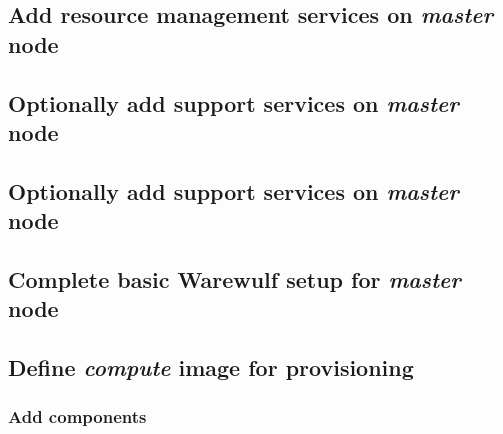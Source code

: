 \documentclass[letterpaper]{article}
\begin{document}
\clearpage
\subsection{Add resource management services on {\em master} node} \label{sec:add_rm}


\subsection{Optionally add \InfiniBand{} support services on {\em master} node} \label{sec:add_ofed}


\subsection{Optionally add \OmniPath{} support services on {\em master} node} \label{sec:add_opa}


\subsection{Complete basic Warewulf setup for {\em master} node} \label{sec:setup_ww}



\subsection{Define {\em compute} image for provisioning}


\subsubsection{Add \OHPC{} components} \label{sec:add_components}

\end{document}
